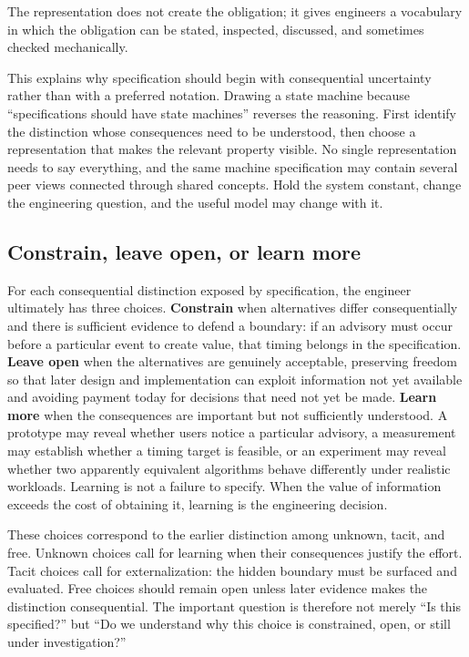 The representation does not create the obligation; it gives engineers a vocabulary in which the
obligation can be stated, inspected, discussed, and sometimes checked mechanically.

This explains why specification should begin with consequential uncertainty rather than with a
preferred notation. Drawing a state machine because ``specifications should have state machines''
reverses the reasoning. First identify the distinction whose consequences need to be understood,
then choose a representation that makes the relevant property visible. No single representation
needs to say everything, and the same machine specification may contain several peer views
connected through shared concepts. Hold the system constant, change the engineering question, and
the useful model may change with it.

\subsection{Constrain, leave open, or learn more}\label{sec-constrain-leave-open-learn}

For each consequential distinction exposed by specification, the engineer ultimately has three
choices. \textbf{Constrain} when alternatives differ consequentially and there is sufficient evidence to
defend a boundary: if an advisory must occur before a particular event to create value, that timing
belongs in the specification. \textbf{Leave open} when the alternatives are genuinely acceptable,
preserving freedom so that later design and implementation can exploit information not yet
available and avoiding payment today for decisions that need not yet be made. \textbf{Learn more} when
the consequences are important but not sufficiently understood. A prototype may reveal whether
users notice a particular advisory, a measurement may establish whether a timing target is
feasible, or an experiment may reveal whether two apparently equivalent algorithms behave
differently under realistic workloads. Learning is not a failure to specify. When the value of
information exceeds the cost of obtaining it, learning is the engineering decision.

These choices correspond to the earlier distinction among unknown, tacit, and free. Unknown choices
call for learning when their consequences justify the effort. Tacit choices call for
externalization: the hidden boundary must be surfaced and evaluated. Free choices should remain
open unless later evidence makes the distinction consequential. The important question is therefore
not merely ``Is this specified?'' but ``Do we understand why this choice is constrained, open, or
still under investigation?''

